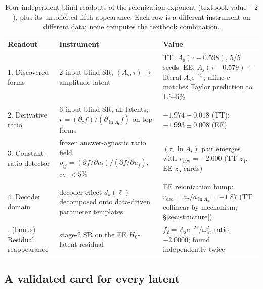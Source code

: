 \documentclass[twocolumn,10pt]{article}
\newcommand{\As}{A_\mathrm{s}}
\newcommand{\omB}{\omega_\mathrm{b}}
\newcommand{\Hz}{H_0}
\newcommand{\lnAs}{\ln A_\mathrm{s}}
\newcommand{\combo}{\As e^{-2\tau}}
\begin{document}
\begin{table}[t]
\centering\small
\caption{Four independent blind readouts of the reionization exponent
(textbook value $-2$), plus its unsolicited fifth appearance. Each row is a
different instrument on different data; none computes the textbook combination.}
\label{tab:minus2}
\begin{tabular}{@{}p{4.1cm}p{5.6cm}p{6.5cm}@{}}
\toprule
Readout & Instrument & Value \\
\midrule
1. Discovered forms & 2-input blind SR, $(\As,\tau)\to$ amplitude latent &
TT: $\As(\tau-0.598)$, 5/5 seeds; EE: $\As(\tau-0.579)$ + literal $\combo$;
affine $c$ matches Taylor prediction to 1.5--5\% \\
2. Derivative ratio & 6-input blind SR, all latents; $r=(\partial_\tau
f)/(\partial_{\lnAs} f)$ on top forms & $-1.974\pm0.018$ (TT);
$-1.993\pm0.008$ (EE) \\
3. Constant-ratio detector & frozen answer-agnostic ratio field
$\rho_{ij}=(\partial f/\partial u_i)/(\partial f/\partial u_j)$, cv $<5\%$ &
$(\tau,\lnAs)$ pair emerges with $r_\mathrm{raw}=-2.000$ (TT $z_4$, EE $z_5$
cards) \\
4. Decoder domain & decoder effect $d_k(\ell)$ decomposed onto data-driven
parameter templates & EE reionization bump: $r_\mathrm{dec}=a_\tau/a_{\lnAs}
=-1.87$ (TT collinear by mechanism; \S\ref{sec:structure}) \\
\addlinespace
5. (bonus) Residual reappearance & stage-2 SR on the EE $\Hz$-latent residual &
$f_2=\combo/\omB^{2}$, ratio $-2.0000$; found independently twice \\
\bottomrule
\end{tabular}
\end{table}

\subsection{A validated card for every latent}
\label{sec:cards}
\end{document}
